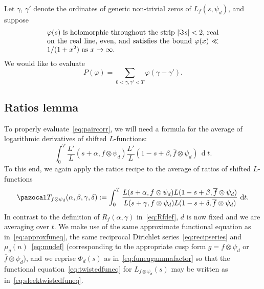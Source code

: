 \documentclass[11pt,reqno]{amsart} \usepackage{fullpage}
\newcommand{\ra}{\rightarrow}
\renewcommand{\d}[1]{\,\operatorname*{d}\!{#1}}
\newcommand\be{\begin{equation}}
\newcommand\ee{\end{equation}}
\newcommand{\T}{\pazocal T_{f\otimes\psi_d}(\alpha,\beta,\gamma,\delta)}
\renewcommand{\L}[1]{L_{f\otimes\psi_d}\left(#1\right)}
\newcommand{\gf}{\Phi_d}
\newcommand{\gfactor}[2][]{\gf#1\left(#2\right)}
\numberwithin{equation}{section}
\begin{document}
Let $\gamma$, $\gamma'$ denote the ordinates of generic non-trivial zeros of
$L_f(s,\psi_d)$, and suppose
\be\label{def:testconditions}\parbox[c][][c]{24em}
{$\varphi(s)$ is holomorphic throughout the strip $|\Im s|<2$,
  real on the real line, even, and satisfies the bound
  $\varphi(x)\ll1/(1+x^2)$ as $x\ra\infty$.}\ee
We would like to evaluate
\be\label{eq:paircorr}
P(\varphi)=\sum_{0<\gamma,\gamma'<T}\varphi\left(\gamma-\gamma'\right).\ee
\subsection{Ratios lemma}
To properly evaluate~\eqref{eq:paircorr}, we will need a formula for the average of
logarithmic derivatives of shifted $L$-functions:
\be\int_0^T\frac{L'}{L}(s+\alpha,f\otimes\psi_d)
\frac{L'}{L}(1-s+\beta,\overline f\otimes\psi_d)\d t.\ee
To this end, we again apply the ratios recipe to the average of ratios of shifted
$L$-functions \be\T:=\int_0^T
\frac{L(s+\alpha,f\otimes\psi_d)L(1-s+\beta,\overline f\otimes\psi_d)}
{L(s+\gamma,f\otimes\psi_d)L(1-s+\delta,\overline f\otimes\psi_d)}\d t.\ee
In contrast to the definition of $R_f(\alpha,\gamma)$ in~\eqref{eq:Rfdef}, $d$ is now fixed
and we are averaging over $t$. We make use of the same approximate functional equation as
in~\eqref{eq:approxfuneq}, the same reciprocal Dirichlet series~\eqref{eq:recipseries} and
$\mu_g(n)$~\eqref{eq:mudef} (corresponding to the appropriate cusp form $g=f\otimes\psi_d$
or $\overline f\otimes\psi_d$), and we reprise $\gfactor{s}$ as
in~\eqref{eq:funeqgammafactor} so that the functional equation~\eqref{eq:twistedfuneq} for
$\L{s}$ may be written as in~\eqref{eq:sleektwistedfuneq}.
\end{document}
